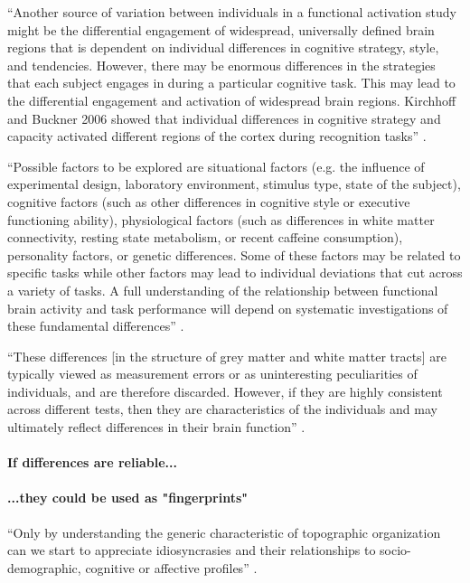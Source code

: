 %
``Another source of variation between individuals in a functional activation
study might be the differential engagement of widespread, universally defined
brain regions that is dependent on individual differences in cognitive strategy,
style, and tendencies.
%
However, there may be enormous differences in the strategies that each subject
engages in during a particular cognitive task.
%
This may lead to the differential engagement and activation of widespread brain
regions.
%
Kirchhoff and Buckner 2006 showed that individual differences in cognitive
strategy and capacity activated different regions of the cortex during
recognition tasks'' \citep{vanhorn2008individual}.

%
``Possible factors to be explored are situational factors (e.g. the influence of
experimental design, laboratory environment, stimulus type, state of the
subject), cognitive factors (such as other differences in cognitive style or
executive functioning ability), physiological factors (such as differences in
white matter connectivity, resting state metabolism, or recent caffeine
consumption), personality factors, or genetic differences.
%
Some of these factors may be related to specific tasks while other factors may
lead to individual deviations that cut across a variety of tasks.
%
A full understanding of the relationship between functional brain activity and
task performance will depend on systematic investigations of these fundamental
differences'' \citep{vanhorn2008individual}.


``These differences [in the structure of grey matter and white matter tracts]
are typically viewed as measurement errors or as uninteresting peculiarities of
individuals, and are therefore discarded.
%
However, if they are highly consistent across different tests, then they are
characteristics of the individuals and may ultimately reflect differences in
their brain function'' \citep{kanai2011structural}.



\paragraph{If differences are reliable...}



\paragraph{...they could be used as "fingerprints"}

%
``Only by understanding the generic characteristic of topographic organization
can we start to appreciate idiosyncrasies and their relationships to
socio-demographic, cognitive or affective profiles''
\citep{eickhoff2018imaging}.

